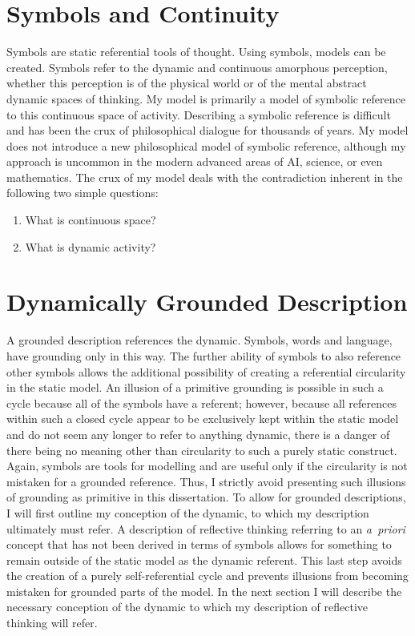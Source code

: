 \section{Symbols and Continuity}

Symbols are static referential tools of thought.  Using symbols,
models can be created.  Symbols refer to the dynamic and continuous
amorphous perception, whether this perception is of the physical world
or of the mental abstract dynamic spaces of thinking.  My model is
primarily a model of symbolic reference to this continuous space of
activity.  Describing a symbolic reference is difficult and has been
the crux of philosophical dialogue for thousands of years.  My model
does not introduce a new philosophical model of symbolic reference,
although my approach is uncommon in the modern advanced areas of AI,
science, or even mathematics.  The crux of my model deals with the
contradiction inherent in the following two simple questions:

\begin{enumerate}
\item What is continuous space?
\item What is dynamic activity?
\end{enumerate}



\section{Dynamically Grounded Description}

A grounded description references the dynamic.  Symbols, words and
language, have grounding only in this way.  The further ability of
symbols to also reference other symbols allows the additional
possibility of creating a referential circularity in the static model.
An illusion of a primitive grounding is possible in such a cycle
because all of the symbols have a referent; however, because all
references within such a closed cycle appear to be exclusively kept
within the static model and do not seem any longer to refer to
anything dynamic, there is a danger of there being no meaning other
than circularity to such a purely static construct.  Again, symbols
are tools for modelling and are useful only if the circularity is not
mistaken for a grounded reference.  Thus, I strictly avoid presenting
such illusions of grounding as primitive in this dissertation.  To
allow for grounded descriptions, I will first outline my conception of
the dynamic, to which my description ultimately must refer.  A
description of reflective thinking referring to an \emph{a~priori}
concept that has not been derived in terms of symbols allows for
something to remain outside of the static model as the dynamic
referent.  This last step avoids the creation of a purely
self-referential cycle and prevents illusions from becoming mistaken
for grounded parts of the model.  In the next section I will describe
the necessary conception of the dynamic to which my description of
reflective thinking will refer.

